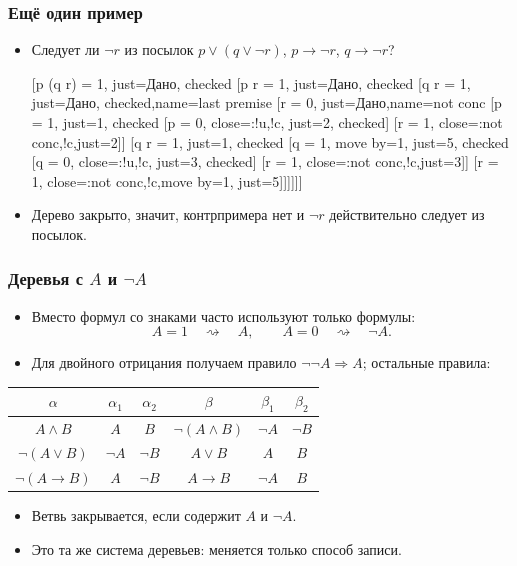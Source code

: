 \documentclass[10pt]{beamer}
\begin{document}
\begin{frame}
\frametitle{Ещё один пример}
\begin{itemize}
    \item Следует ли $\lnot r$ из посылок $p \vee (q \vee \lnot r)$, $p \to \lnot r$, $q \to \lnot r$?
    \begin{tableau}{}
        [{p \lor (q \lor \lnot r) = 1}, just=Дано, checked
        [{p \to \lnot r = 1}, just=Дано, checked
        [{q \to \lnot r = 1}, just=Дано, checked,name=last premise
        [{\lnot r = 0}, just=Дано,name=not conc
        [{p = 1}, just={1}, checked
        [{p = 0}, close={:!u,!c}, just={2}, checked]
        [{\lnot r = 1}, close={:not conc,!c},just={2}]]
        [{q \vee \lnot r = 1}, just={1}, checked
        [{q = 1}, move by=1, just={5}, checked
        [{q = 0}, close={:!u,!c}, just={3}, checked]
        [{\lnot r = 1}, close={:not conc,!c},just={3}]]
        [{\lnot r = 1}, close={:not conc,!c},move by=1, just={5}]]]]]]
    \end{tableau}
    \item Дерево закрыто, значит, \pause контрпримера нет и $\lnot r$ действительно следует из посылок.
\end{itemize}
\end{frame}

\begin{frame}
\frametitle{Деревья с $A$ и $\neg A$}
\begin{itemize}
    \item Вместо формул со знаками часто используют только формулы:
    \[
        A=1 \quad\rightsquigarrow\quad A,
        \qquad
        A=0 \quad\rightsquigarrow\quad \neg A.
    \]
    \item Для двойного отрицания получаем правило $\neg\neg A \Rightarrow A$; остальные правила:
\end{itemize}
\begin{center}
    \begin{tabular}{|c | c | c || c | c | c |}
        \hline
        $\alpha$ & $\alpha_1$ & $\alpha_2$ & $\beta$ & $\beta_1$ & $\beta_2$ \\
        \hline
        $A \land B$ & $A$ & $B$ & $\neg(A \land B)$ & $\neg A$ & $\neg B$ \\
        $\neg(A \lor B)$ & $\neg A$ & $\neg B$ & $A \lor B$ & $A$ & $B$ \\
        $\neg(A \to B)$ & $A$ & $\neg B$ & $A \to B$ & $\neg A$ & $B$ \\
        \hline
    \end{tabular}
\end{center}
\begin{itemize}
    \item Ветвь закрывается, если содержит $A$ и $\neg A$.
    \item Это та же система деревьев: меняется только способ записи.
\end{itemize}
\end{frame}
\end{document}
